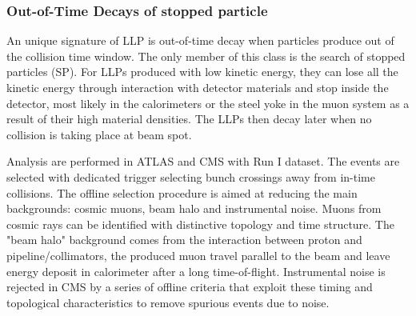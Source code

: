 \subsubsection{Out-of-Time Decays of stopped particle}

An unique signature of LLP is out-of-time decay when particles produce out of the collision time window. The only member of this class is the search of stopped particles (SP). For LLPs produced with low kinetic energy, they can lose all the kinetic energy through interaction with detector materials and stop inside the detector, most likely in the calorimeters or the steel yoke in the muon system as a result of their high material densities. The LLPs then decay later when no collision is taking place at beam spot. 

Analysis are performed in ATLAS and CMS with Run I dataset. The events are selected with dedicated trigger selecting bunch crossings away from in-time collisions. The offline selection procedure is aimed at reducing the main backgrounds: cosmic muons, beam halo and instrumental noise. Muons from cosmic rays can be identified with distinctive topology and time structure. The "beam halo" background comes from the interaction between proton and pipeline/collimators, the produced muon travel parallel to the beam and leave energy deposit in calorimeter after a long time-of-flight. Instrumental noise is rejected in CMS by a series of offline criteria that exploit these timing and topological characteristics to remove spurious events due to noise.

